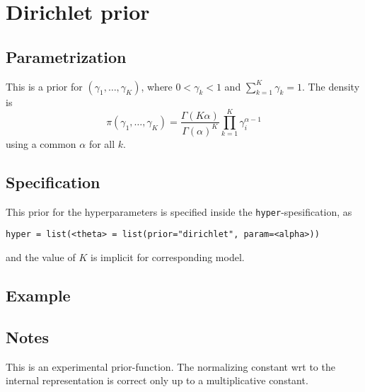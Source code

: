 \documentclass[a4paper,11pt]{article}
\begin{document}
\section*{Dirichlet prior}

\subsection*{Parametrization}
This is a prior for $(\gamma_1, \ldots, \gamma_K)$, where
$0<\gamma_k<1$ and $\sum_{k=1}^{K} \gamma_k = 1$. The density is
\begin{displaymath}
    \pi(\gamma_1, \ldots, \gamma_K) = \frac{\Gamma(K\alpha)}{\Gamma(\alpha)^{K}}
    \prod_{k=1}^{K} \gamma_i^{\alpha-1}
\end{displaymath}
using a common $\alpha$ for all $k$.

\subsection*{Specification}

This prior for the hyperparameters is specified inside the
\texttt{hyper}-spesification, as
\begin{center}
    \texttt{hyper = list(<theta> =
        list(prior="dirichlet", param=<alpha>))}
\end{center}
and the value of $K$ is implicit for corresponding model.



\subsection*{Example}

\subsection*{Notes}

This is an experimental prior-function. The normalizing constant wrt
to the internal representation is correct only up to a multiplicative
constant.
\end{document}
